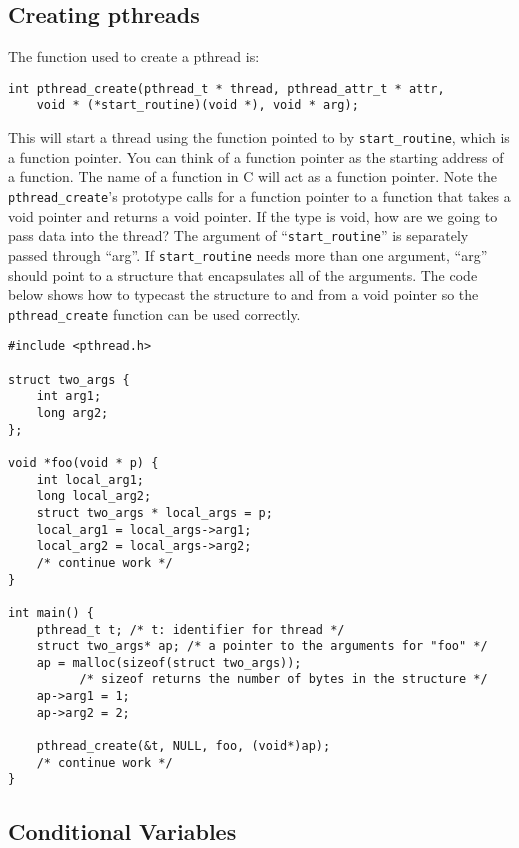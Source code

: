 \documentclass[letterpaper,10pt]{article}
\begin{document}
\subsection{Creating pthreads}
The function used to create a pthread is:
\begin{verbatim}
int pthread_create(pthread_t * thread, pthread_attr_t * attr,
    void * (*start_routine)(void *), void * arg);
\end{verbatim}
This will start a thread using the function pointed to by \verb+start_routine+, which is a function
pointer. You can think of a function pointer as the starting address of a function. The
name of a function in C will act as a function pointer. Note the \verb+pthread_create+'s
prototype calls for a function pointer to a function that takes a void pointer and returns a
void pointer. If the type is void, how are we going to pass data into the thread?
The argument of ``\verb+start_routine+'' is separately passed through ``arg''. If \verb+start_routine+ needs
more than one argument, ``arg'' should point to a structure that encapsulates all of
the arguments. The code below shows how to typecast the structure to and from a void
pointer so the \verb+pthread_create+ function can be used correctly.
\label{createex}
\begin{verbatim}
#include <pthread.h>

struct two_args {
    int arg1;
    long arg2;
};

void *foo(void * p) {
    int local_arg1;
    long local_arg2;
    struct two_args * local_args = p;
    local_arg1 = local_args->arg1;
    local_arg2 = local_args->arg2;
    /* continue work */
}

int main() {
    pthread_t t; /* t: identifier for thread */
    struct two_args* ap; /* a pointer to the arguments for "foo" */
    ap = malloc(sizeof(struct two_args));
          /* sizeof returns the number of bytes in the structure */
    ap->arg1 = 1;
    ap->arg2 = 2;

    pthread_create(&t, NULL, foo, (void*)ap);
    /* continue work */
}
\end{verbatim}



\subsection{Conditional Variables}
\end{document}
